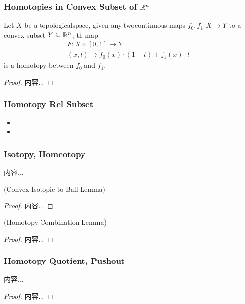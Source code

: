 \documentclass[Total.tex]{subfiles}
\begin{document}
			\subsubsection{Homotopies in Convex Subset of $\mathbb{R}^n$}
			\begin{lemma}
				Let $X$ be a topologicalspace, given any twocontinuous maps $f_0,f_1:X\rightarrow Y$ to a convex subset $Y\subseteq \mathbb{R}^n$, th map
				\begin{gather*}
					F:X\times [0,1]\rightarrow Y\\
					(x,t)\mapsto f_0(x)\cdot (1-t)+f_1(x)\cdot t
				\end{gather*}
				is a homotopy between $f_0$ and $f_1$.
			\end{lemma}
			\begin{proof}
				内容...
			\end{proof}
			
			\subsubsection{Homotopy Rel Subset}
			\begin{Def}
				\begin{itemize}
					\item 
					\item 
				\end{itemize}
			\end{Def}
			\subsubsection{Isotopy, Homeotopy}
			
			\begin{Def}
				内容...
			\end{Def}
			\begin{lemma}
				(Convex-Isotopic-to-Ball Lemma)
			\end{lemma}
			\begin{proof}
				内容...
			\end{proof}
			\begin{lemma}
				(Homotopy Combination Lemma)
			\end{lemma}
			\begin{proof}
				内容...
			\end{proof}
			\subsubsection{Homotopy Quotient, Pushout}
			\begin{theorem}
				内容...
			\end{theorem}
			\begin{proof}
				内容...
			\end{proof}
\end{document}
